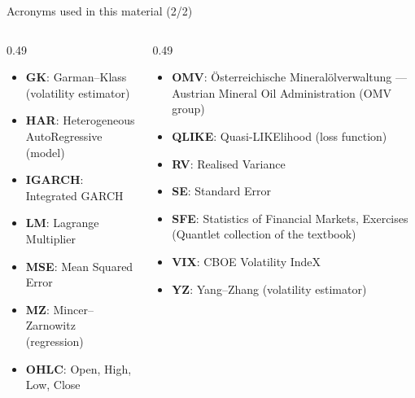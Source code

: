 \begin{frame}{Acronyms used in this material (2/2)}
\begin{columns}[T]
\begin{column}{0.49\textwidth}
\begin{itemize}\setlength{\itemsep}{0pt}
    \item \textbf{GK}: Garman–Klass (volatility estimator)
    \item \textbf{HAR}: Heterogeneous AutoRegressive (model)
    \item \textbf{IGARCH}: Integrated GARCH
    \item \textbf{LM}: Lagrange Multiplier
    \item \textbf{MSE}: Mean Squared Error
    \item \textbf{MZ}: Mincer–Zarnowitz (regression)
    \item \textbf{OHLC}: Open, High, Low, Close
\end{itemize}
\end{column}
\begin{column}{0.49\textwidth}
\begin{itemize}\setlength{\itemsep}{0pt}
    \item \textbf{OMV}: Österreichische Mineralölverwaltung — Austrian Mineral Oil Administration (OMV group)
    \item \textbf{QLIKE}: Quasi-LIKElihood (loss function)
    \item \textbf{RV}: Realised Variance
    \item \textbf{SE}: Standard Error
    \item \textbf{SFE}: Statistics of Financial Markets, Exercises (Quantlet collection of the textbook)
    \item \textbf{VIX}: CBOE Volatility IndeX
    \item \textbf{YZ}: Yang–Zhang (volatility estimator)
\end{itemize}
\end{column}
\end{columns}
\end{frame}

